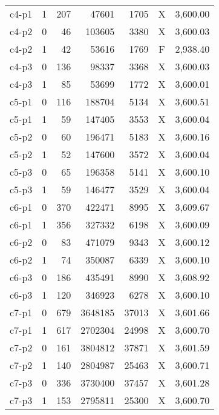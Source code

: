 \documentclass[ppgc,tese,english,formais,babel]{iiufrgs}
\begin{document}
\begin{spacing}{1.0}
\begin{longtable}{lcrrrcr}
c4-p1 & 1 & 207 & 47601 & 1705 & X & 3,600.00 \\
c4-p2 & 0 & 46 & 103605 & 3380 & X & 3,600.03 \\
c4-p2 & 1 & 42 & 53616 & 1769 & F & 2,938.40 \\
c4-p3 & 0 & 136 & 98337 & 3368 & X & 3,600.03 \\
c4-p3 & 1 & 85 & 53699 & 1772 & X & 3,600.01 \\
c5-p1 & 0 & 116 & 188704 & 5134 & X & 3,600.51 \\
c5-p1 & 1 & 59 & 147405 & 3553 & X & 3,600.04 \\
c5-p2 & 0 & 60 & 196471 & 5183 & X & 3,600.16 \\
c5-p2 & 1 & 52 & 147600 & 3572 & X & 3,600.04 \\
c5-p3 & 0 & 65 & 196358 & 5141 & X & 3,600.10 \\
c5-p3 & 1 & 59 & 146477 & 3529 & X & 3,600.04 \\
c6-p1 & 0 & 370 & 422471 & 8995 & X & 3,609.67 \\
c6-p1 & 1 & 356 & 327332 & 6198 & X & 3,600.09 \\
c6-p2 & 0 & 83 & 471079 & 9343 & X & 3,600.12 \\
c6-p2 & 1 & 74 & 350087 & 6339 & X & 3,600.10 \\
c6-p3 & 0 & 186 & 435491 & 8990 & X & 3,608.92 \\
c6-p3 & 1 & 120 & 346923 & 6278 & X & 3,600.10 \\
c7-p1 & 0 & 679 & 3648185 & 37013 & X & 3,601.66 \\
c7-p1 & 1 & 617 & 2702304 & 24998 & X & 3,600.70 \\
c7-p2 & 0 & 161 & 3804812 & 37871 & X & 3,601.59 \\
c7-p2 & 1 & 140 & 2804987 & 25463 & X & 3,600.71 \\
c7-p3 & 0 & 336 & 3730400 & 37457 & X & 3,601.28 \\
c7-p3 & 1 & 153 & 2795811 & 25300 & X & 3,600.70 \\\hline\hline
\end{longtable}
\end{spacing}

\pagebreak
\end{document}
